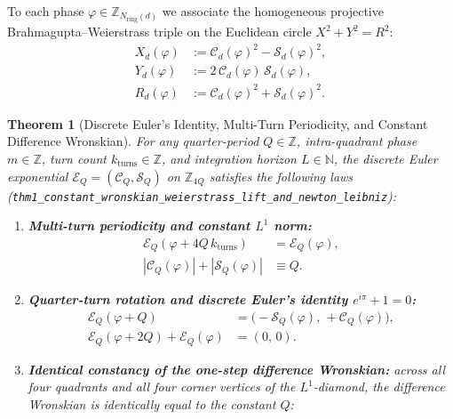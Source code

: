 \documentclass[11pt,a4paper]{article}
\theoremstyle{plain}
\newtheorem{theorem}{Theorem}[section]
\theoremstyle{definition}
\begin{document}
To each phase $\varphi \in \mathbb{Z}_{N_{\mathrm{ring}}(d)}$ we associate the homogeneous projective Brahmagupta--Weierstrass triple on the Euclidean circle $X^2 + Y^2 = R^2$:
\begin{align}
  X_d(\varphi) &:= \mathcal{C}_d(\varphi)^2 - \mathcal{S}_d(\varphi)^2, \label{eq:weierstrass-x} \\
  Y_d(\varphi) &:= 2\,\mathcal{C}_d(\varphi)\,\mathcal{S}_d(\varphi), \label{eq:weierstrass-y} \\
  R_d(\varphi) &:= \mathcal{C}_d(\varphi)^2 + \mathcal{S}_d(\varphi)^2. \label{eq:weierstrass-r}
\end{align}

\begin{theorem}[Discrete Euler's Identity, Multi-Turn Periodicity, and Constant Difference Wronskian]
\label{thm:main-1}
For any quarter-period $Q \in \mathbb{Z}$, intra-quadrant phase $m \in \mathbb{Z}$, turn count $k_{\mathrm{turns}} \in \mathbb{Z}$, and integration horizon $L \in \mathbb{N}$, the discrete Euler exponential $\mathcal{E}_Q = (\mathcal{C}_Q, \mathcal{S}_Q)$ on $\mathbb{Z}_{4Q}$ satisfies the following laws (\texttt{thm1\_constant\_wronskian\_weierstrass\_lift\_and\_newton\_leibniz}):
\begin{enumerate}[label=\textbf{(\roman*)},leftmargin=*]
\item \textbf{Multi-turn periodicity and constant $L^1$ norm:}
  \begin{align}
    \mathcal{E}_Q(\varphi + 4Q\,k_{\mathrm{turns}}) &= \mathcal{E}_Q(\varphi), \label{eq:rotator-period} \\
    |\mathcal{C}_Q(\varphi)| + |\mathcal{S}_Q(\varphi)| &\equiv Q. \label{eq:rotator-l1}
  \end{align}
\item \textbf{Quarter-turn rotation and discrete Euler's identity $e^{i\pi} + 1 = 0$:}
  \begin{align}
    \mathcal{E}_Q(\varphi + Q) &= \bigl(-\mathcal{S}_Q(\varphi),\, +\mathcal{C}_Q(\varphi)\bigr), \label{eq:rotator-quarter-turn} \\
    \mathcal{E}_Q(\varphi + 2Q) + \mathcal{E}_Q(\varphi) &= (0,\, 0). \label{eq:rotator-euler-identity}
  \end{align}
\item \textbf{Identical constancy of the one-step difference Wronskian:}
  across all four quadrants and all four corner vertices of the $L^1$-diamond, the difference Wronskian is identically equal to the constant $Q$:
  \begin{equation}

\end{equation}
\end{enumerate}
\end{theorem}
\end{document}
